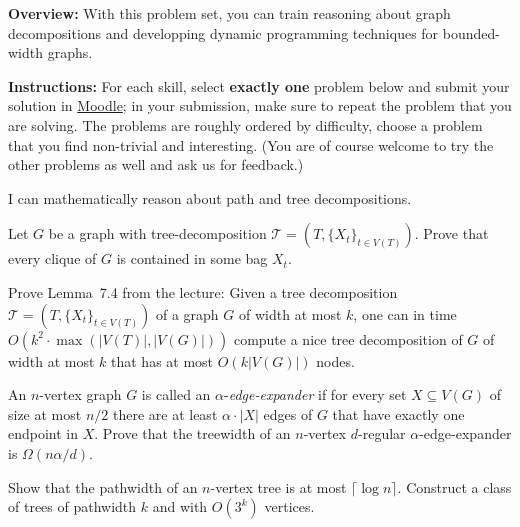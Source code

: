 \documentclass{uebung_cs}
\begin{document}
\textbf{Overview:} With this problem set, you can train reasoning about graph decompositions and developping dynamic programming techniques for bounded-width graphs.

\textbf{Instructions:} For each skill, select \textbf{exactly one} problem below and submit your solution in \href{https://moodle.studiumdigitale.uni-frankfurt.de/moodle/course/view.php?id=6259}{Moodle}; in your submission, make sure to repeat the problem that you are solving.
The problems are roughly ordered by difficulty, choose a problem that you find non-trivial and interesting. (You are of course welcome to try the other problems as well and ask us for feedback.)

\begin{skill}
  I can mathematically reason about path and tree decompositions.
\end{skill}

\begin{exercise}
  Let $G$ be a graph with tree-decomposition $\mathcal{T}=(T,\{X_t\}_{t\in V(T)})$. Prove that every clique of $G$ is contained in some bag $X_t$.
  \end{exercise}
  
  \begin{exercise}
  Prove Lemma~7.4 from the lecture:
  {Given a tree decomposition $\mathcal{T}=(T,\{X_t\}_{t\in V(T)})$ of a graph $G$ of width at most $k$, one can in time $O(k^2\cdot \max(|V(T)|,|V(G)|))$ compute a nice tree decomposition of $G$ of width at most $k$ that has at most $O(k|V(G)|)$ nodes.
  }
  \end{exercise}

  \begin{exercise}
    An $n$-vertex graph $G$ is called an $\alpha$-\emph{edge-expander} if for every set $X \subseteq V(G)$ of size at most $n/2$ there are at least $\alpha\cdot |X|$ edges of $G$ that have exactly one endpoint in $X$. Prove that the treewidth of an $n$-vertex $d$-regular $\alpha$-edge-expander is $\Omega(n\alpha/d)$.
  \end{exercise}
  
  \begin{exercise}[Pathwidth][\hard]
  Show that the pathwidth of an $n$-vertex tree is at most $\lceil \log n \rceil$. Construct a class of trees of pathwidth $k$ and with $O(3^k)$ vertices.
  \end{exercise}
  
\end{document}
